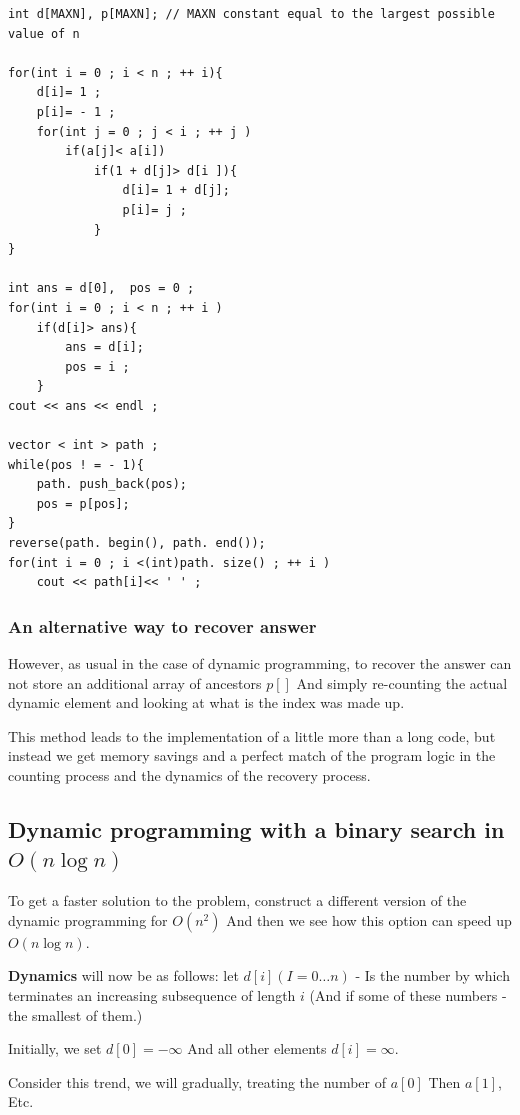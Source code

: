 \begin{verbatim}
int d[MAXN], p[MAXN]; // MAXN constant equal to the largest possible value of n
 
for(int i = 0 ; i < n ; ++ i){
    d[i]= 1 ;
    p[i]= - 1 ;
    for(int j = 0 ; j < i ; ++ j )
        if(a[j]< a[i])
            if(1 + d[j]> d[i ]){
                d[i]= 1 + d[j];
                p[i]= j ;
            }
}
 
int ans = d[0],  pos = 0 ;
for(int i = 0 ; i < n ; ++ i )
    if(d[i]> ans){
        ans = d[i];
        pos = i ;
    }
cout << ans << endl ;
 
vector < int > path ;
while(pos ! = - 1){
    path. push_back(pos);
    pos = p[pos];
}
reverse(path. begin(), path. end());
for(int i = 0 ; i <(int)path. size() ; ++ i )
    cout << path[i]<< ' ' ; 
\end{verbatim}

\subsubsection{ An alternative way to recover answer }

However, as usual in the case of dynamic programming, to recover the answer can not store an additional array of ancestors $p []$ And simply re-counting the actual dynamic element and looking at what is the index was made up.

This method leads to the implementation of a little more than a long code, but instead we get memory savings and a perfect match of the program logic in the counting process and the dynamics of the recovery process.

\subsection{ Dynamic programming with a binary search in $O (n \log n)$ }

To get a faster solution to the problem, construct a different version of the dynamic programming for $O (n ^ 2)$ And then we see how this option can speed up $O (n \log n)$.

\textbf{Dynamics} will now be as follows: let $d [i]$$(I = 0 \ldots n)$ - Is the number by which terminates an increasing subsequence of length $i$ (And if some of these numbers - the smallest of them.)

Initially, we set $d [0] = - \infty$ And all other elements $d [i] = \infty$.

Consider this trend, we will gradually, treating the number of $a [0]$ Then $a [1]$, Etc.

